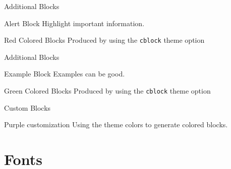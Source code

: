\documentclass[newPxFont,numfooter,sectionpages]{beamer}
\begin{document}

\begin{frame}{Additional Blocks}
\begin{alertblock}{Alert Block}
	Highlight important information.
\end{alertblock}

\begingroup
{}
\begin{block}{Red Colored Blocks}
	Produced by using the \texttt{cblock} theme option
\end{block}
\endgroup
\end{frame}


\begin{frame}{Additional Blocks}

\begin{exampleblock}{Example Block}
	Examples can be good.
\end{exampleblock}

\begingroup
{}
\begin{block}{Green Colored Blocks}
	Produced by using the \texttt{cblock} theme option
\end{block}
\endgroup

\end{frame}


\begin{frame}{Custom Blocks}
\begingroup
{}
\begin{block}{Purple customization}
	Using the theme colors to generate colored blocks.
\end{block}
\endgroup

\end{frame}

%
%
\section{Fonts}
\end{document}
